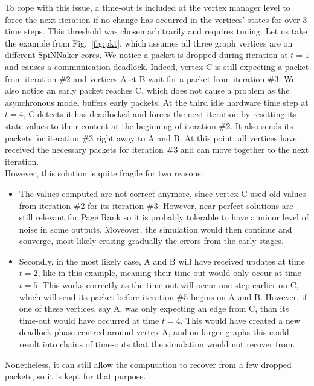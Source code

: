 To cope with this issue, a time-out is included at the vertex manager level to force the next iteration if no change has occurred in the vertices' states for over 3 time steps. This threshold was chosen arbitrarily and requires tuning. Let us take the example from Fig.~\ref{fig:pkt}, which assumes all three graph vertices are on different SpiNNaker cores. We notice a packet is dropped during iteration at $t=1$ and causes a communication deadlock. Indeed, vertex C is still expecting a packet from iteration \#2 and vertices A et B wait for a packet from iteration \#3. We also notice an early packet reaches C, which does not cause a problem as the asynchronous model buffers early packets. At the third idle hardware time step at $t=4$, C detects it has deadlocked and forces the next iteration by resetting its state values to their content at the beginning of iteration \#2. It also sends its packets for iteration \#3 right away to A and B. At this point, all vertices have received the necessary packets for iteration \#3 and can move together to the next iteration. \\

However, this solution is quite fragile for two reasons: 

\begin{itemize}
\item The values computed are not correct anymore, since vertex C used old values from iteration \#2 for its iteration \#3. However, near-perfect solutions are still relevant for Page Rank so it is probably tolerable to have a minor level of noise in some outputs. Moveover, the simulation would then continue and converge, most likely erasing gradually the errors from the early stages.

\item Secondly, in the most likely case, A and B will have received updates at time $t=2$, like in this example, meaning their time-out would only occur at time $t=5$. This works correctly as the time-out will occur one step earlier on C, which will send its packet before iteration \#5 begins on A and B. However, if one of these vertices, say A, was only expecting an edge from C, than its time-out would have occurred at time $t=4$. This would have created a new deadlock phase centred around vertex A, and on larger graphs this could result into chains of time-outs that the simulation would not recover from.
\end{itemize}


Nonetheless, it can still allow the computation to recover from a few dropped packets, so it is kept for that purpose.


